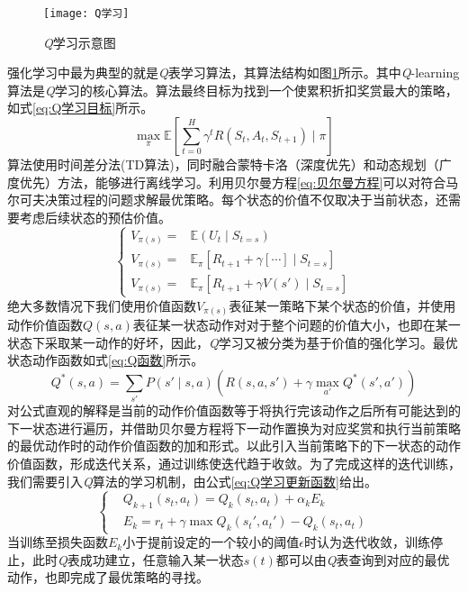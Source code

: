 \begin{figure}[h]
	\centering
	\texttt{[image: Q学习]}
	\caption{\textit{Q}学习示意图}
	\label{fig:Q学习}
\end{figure}

强化学习中最为典型的就是\textit{Q}表学习算法，其算法结构如图\ref{fig:Q学习}所示。其中\textit{Q}-learning算法是\textit{Q}学习的核心算法。算法最终目标为找到一个使累积折扣奖赏最大的策略，如式\ref{eq:Q学习目标}所示。
\begin{equation}\label{eq:Q学习目标}
\underset{\pi}{\max }\mathbb{E}\left [ \sum_{t=0}^{H}\gamma^{t}R\left ( S_{t},A_{t},S_{t+1} \right )\mid\pi \right ]
\end{equation}
算法使用时间差分法(TD算法)，同时融合蒙特卡洛（深度优先）和动态规划（广度优先）方法，能够进行离线学习。利用贝尔曼方程\ref{eq:贝尔曼方程}可以对符合马尔可夫决策过程的问题求解最优策略。每个状态的价值不仅取决于当前状态，还需要考虑后续状态的预估价值。
\begin{equation}\label{eq:贝尔曼方程}
\left\lbrace 
	\begin{aligned}
	V_{\pi(s)}=&\mathbb{E}\left ( U_{t}\mid S_{t=s} \right )\\
	V_{\pi(s)}=&\mathbb{E}_{\pi}\left [ R_{t+1}+\gamma \left [ \cdots \right ]\mid S_{t=s} \right ]\\
	V_{\pi(s)}=&\mathbb{E}_{\pi}\left [ R_{t+1}+\gamma V\left ( {s}' \right )\mid S_{t=s} \right ]
	\end{aligned}
	\right.
\end{equation}
绝大多数情况下我们使用价值函数$V_{\pi(s)}$表征某一策略下某个状态的价值，并使用动作价值函数$Q(s,a)$表征某一状态动作对对于整个问题的价值大小，也即在某一状态下采取某一动作的好坏，因此，\textit{Q}学习又被分类为基于价值的强化学习。最优状态动作函数如式\ref{eq:Q函数}所示。
\begin{equation}\label{eq:Q函数}
Q^{*}\left ( s,a \right )=\sum _{{s}'}P\left ( {s}'\mid s,a \right )\left ( R\left ( s,a,{s}' \right ) +\gamma\max _{{a}'}Q^{*}\left ( {s}' ,{a}'\right )\right )
\end{equation}
对公式直观的解释是当前的动作价值函数等于将执行完该动作之后所有可能达到的下一状态进行遍历，并借助贝尔曼方程将下一动作置换为对应奖赏和执行当前策略的最优动作时的动作价值函数的加和形式。以此引入当前策略下的下一状态的动作价值函数，形成迭代关系，通过训练使迭代趋于收敛。为了完成这样的迭代训练，我们需要引入\textit{Q}算法的学习机制，由公式\ref{eq:Q学习更新函数}给出。
\begin{equation}\label{eq:Q学习更新函数}
\left\lbrace 
	\begin{aligned}
	&Q_{k+1}\left ( s_{t},a_{t} \right )=Q_{k}\left ( s_{t},a_{t} \right )+\alpha_{k}E_{k}\\
	&E_{k}=r_{t}+\gamma\max Q_{k}\left ( {s_{t}}' ,{a_{t}}'\right )-Q_{k}\left ( s_{t},a_{t}\right )
	\end{aligned}
\right.
\end{equation}
当训练至损失函数$E_{k}$小于提前设定的一个较小的阈值$\epsilon$时认为迭代收敛，训练停止，此时\textit{Q}表成功建立，任意输入某一状态$s(t)$都可以由\textit{Q}表查询到对应的最优动作，也即完成了最优策略的寻找。
